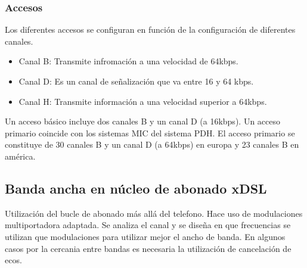 \subsubsection{Accesos}
Los diferentes accesos se configuran en función de la configuración de diferentes canales.
\begin{itemize}
	\item Canal B: Transmite infromación a una velocidad de 64kbps.
	\item Canal D: Es un canal de señalización que va entre 16 y 64 kbps.
	\item Canal H: Transmite información a una velocidad superior a 64kbps.
\end{itemize}
Un acceso básico incluye dos canales B y un canal D (a 16kbps). Un acceso primario coincide con los sistemas MIC del sistema \acrshort{PDH}. El acceso primario se constituye de 30 canales B y un canal D (a 64kbps) en europa y 23 canales B en américa.
\subsection{Banda ancha en núcleo de abonado xDSL}
Utilización del bucle de abonado más allá del telefono. Hace uso de modulaciones multiportadora adaptada. Se analiza el canal y se diseña en que frecuencias se utilizan que modulaciones para utilizar mejor el ancho de banda. En algunos casos por la cercania entre bandas es necesaria la utilización de cancelación de ecos.
